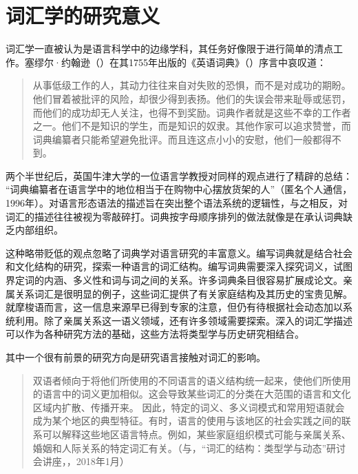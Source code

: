 \section{词汇学的研究意义}
\label{sec:recherche}

词汇学一直被认为是语言科学中的边缘学科，其任务好像限于进行简单的清点工作。塞缪尔·约翰逊（）在其1755年出版的《英语词典》（）序言中哀叹道：

\begin{quotation}
    从事低级工作的人，其动力往往来自对失败的恐惧，而不是对成功的期盼。他们冒着被批评的风险，却很少得到表扬。他们的失误会带来耻辱或惩罚，而他们的成功却无人关注，也得不到奖励。词典作者就是这些不幸的工作者之一。他们不是知识的学生，而是知识的奴隶。其他作家可以追求赞誉，而词典编纂者只能希望避免批评。而且连这点小小的安慰，他们一般都得不到。
\end{quotation}

两个半世纪后，英国牛津大学的一位语言学教授对同样的观点进行了精辟的总结： “词典编纂者在语言学中的地位相当于在购物中心摆放货架的人”（匿名个人通信，1996年）。对语言形态语法的描述旨在突出整个语法系统的逻辑性，与之相反，对词汇的描述往往被视为零敲碎打。词典按字母顺序排列的做法就像是在承认词典缺乏内部组织。

这种略带贬低的观点忽略了词典学对语言研究的丰富意义。编写词典就是结合社会和文化结构的研究，探索一种语言的词汇结构。编写词典需要深入探究词义，试图界定词的内涵、多义性和词与词之间的关系。许多词典条目很容易扩展成论文。亲属关系词汇是很明显的例子，这些词汇提供了有关家庭结构及其历史的宝贵见解。就摩梭语而言，这一信息来源早已得到专家的注意\parencite{fu1983}，但仍有待根据社会动态加以系统利用\parencite{milan2021entraide}。除了亲属关系这一语义领域，还有许多领域需要探索。深入的词汇学描述可以作为各种研究方法的基础，这些方法将类型学与历史研究相结合。

其中一个很有前景的研究方向是研究语言接触对词汇的影响。

\begin{quotation}
    双语者倾向于将他们所使用的不同语言的语义结构统一起来，使他们所使用的语言中的词义更加相似。这会导致某些词汇的分类在大范围的语言和文化区域内扩散、传播开来。
    因此，特定的词义、多义词模式和常用短语就会成为某个地区的典型特征。有时，语言的使用与该地区的社会实践之间的联系可以解释这些地区语言特点。例如，某些家庭组织模式可能与亲属关系、婚姻和人际关系的特定词汇有关。（与，“词汇的结构：类型学与动态”研讨会讲座，，2018年1月）
\end{quotation}

